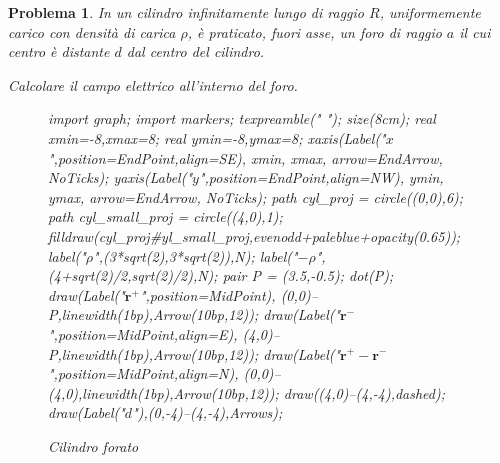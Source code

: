 \documentclass[b5paper,twoside]{book}
\newtheorem{problema}{Problema}
\let\oldhat\hat
\renewcommand{\vec}[1]{\mathbf{#1}}
\renewcommand{\hat}[1]{\widehat{\mathbf{#1}}}
\begin{document}
\begin{problema}
	In un cilindro infinitamente lungo di raggio $R$, uniformemente carico
	con densità di carica $\rho$, è praticato, fuori asse, un foro di raggio $a$
	il cui centro è distante $d$ dal centro del cilindro.
	
	Calcolare il campo elettrico all'interno del foro.
	\begin{figure}
		\centering
		\begin{asy}
			import graph;
			import markers;
			texpreamble("\let\oldhat\hat
			\renewcommand{\vec}[1]{\mathbf{#1}}
			\renewcommand{\hat}[1]{\oldhat{\mathbf{#1}}}");
			size(8cm);
			real xmin=-8,xmax=8;
			real ymin=-8,ymax=8;
			xaxis(Label("\small $x$",position=EndPoint,align=SE),
			xmin, xmax, arrow=EndArrow, NoTicks);
			yaxis(Label("\small $y$",position=EndPoint,align=NW),
			ymin, ymax, arrow=EndArrow, NoTicks);
			path cyl_proj = circle((0,0),6);
			path cyl_small_proj = circle((4,0),1);
			filldraw(cyl_proj^^cyl_small_proj,evenodd+paleblue+opacity(0.65));
			label("$\rho$",(3*sqrt(2),3*sqrt(2)),N);
			label("$-\rho$",(4+sqrt(2)/2,sqrt(2)/2),N);
			pair P = (3.5,-0.5);
			dot(P);
			draw(Label("\small $\vec{r^+}$",position=MidPoint),
			(0,0)--P,linewidth(1bp),Arrow(10bp,12));
			draw(Label("\small $\vec{r^-}$",position=MidPoint,align=E),
			(4,0)--P,linewidth(1bp),Arrow(10bp,12));
			draw(Label("\small $\vec{r^+-r^-}$",position=MidPoint,align=N),
			(0,0)--(4,0),linewidth(1bp),Arrow(10bp,12));	
			draw((4,0)--(4,-4),dashed);
			draw(Label("\small $d$"),(0,-4)--(4,-4),Arrows);
		\end{asy}
		\caption{Cilindro forato}
		\label{fig:cilindro_forato}
	\end{figure}
\end{problema}
\end{document}
